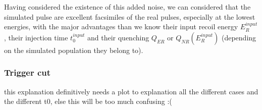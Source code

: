Having considered the existence of this added noise, we can considered that the simulated pulse are excellent facsimiles of the real pulses, especially at the lowest energies, with the major advantages than we know their input recoil energy $E_R^{input}$, their injection time $t_0^{input}$ and their quenching $Q_{ER}$ or $Q_{NR}(E_R^{input})$ (depending on the simulated population they belong to).


\subsubsection{Trigger cut}
\label{par:livetime-cut}

{\color{red} this explanation definitively needs a plot to explanation all the different cases and the different t0, else this will be too much confusing :(}

